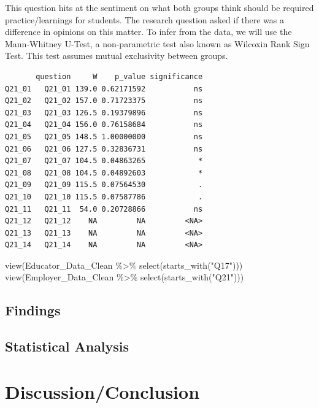 \documentclass[
  11pt,
  letterpaper,
  DIV=11,
  numbers=noendperiod]{scrartcl}
\newenvironment{Shaded}{\begin{snugshade}}{\end{snugshade}}
\newcommand{\FunctionTok}[1]{\textcolor[rgb]{0.28,0.35,0.67}{#1}}
\newcommand{\NormalTok}[1]{\textcolor[rgb]{0.00,0.23,0.31}{#1}}
\newcommand{\SpecialCharTok}[1]{\textcolor[rgb]{0.37,0.37,0.37}{#1}}
\newcommand{\StringTok}[1]{\textcolor[rgb]{0.13,0.47,0.30}{#1}}
\begin{document}
This question hits at the sentiment on what both groups think should be
required practice/learnings for students. The research question asked if
there was a difference in opinions on this matter. To infer from the
data, we will use the Mann-Whitney U-Test, a non-parametric test also
known as Wilcoxin Rank Sign Test. This test assumes mutual exclusivity
between groups.

\begin{verbatim}
       question     W    p_value significance
Q21_01   Q21_01 139.0 0.62171592           ns
Q21_02   Q21_02 157.0 0.71723375           ns
Q21_03   Q21_03 126.5 0.19379896           ns
Q21_04   Q21_04 156.0 0.76158684           ns
Q21_05   Q21_05 148.5 1.00000000           ns
Q21_06   Q21_06 127.5 0.32836731           ns
Q21_07   Q21_07 104.5 0.04863265            *
Q21_08   Q21_08 104.5 0.04892603            *
Q21_09   Q21_09 115.5 0.07564530            .
Q21_10   Q21_10 115.5 0.07587786            .
Q21_11   Q21_11  54.0 0.20728866           ns
Q21_12   Q21_12    NA         NA         <NA>
Q21_13   Q21_13    NA         NA         <NA>
Q21_14   Q21_14    NA         NA         <NA>
\end{verbatim}

\begin{Shaded}
\begin{Highlighting}[]
\FunctionTok{view}\NormalTok{(Educator\_Data\_Clean }\SpecialCharTok{\%\textgreater{}\%} \FunctionTok{select}\NormalTok{(}\FunctionTok{starts\_with}\NormalTok{(}\StringTok{"Q17"}\NormalTok{)))}
\FunctionTok{view}\NormalTok{(Employer\_Data\_Clean }\SpecialCharTok{\%\textgreater{}\%} \FunctionTok{select}\NormalTok{(}\FunctionTok{starts\_with}\NormalTok{(}\StringTok{"Q21"}\NormalTok{)))}
\end{Highlighting}
\end{Shaded}

\subsection{Findings}\label{findings}

\subsection{Statistical Analysis}\label{statistical-analysis}

\section{Discussion/Conclusion}\label{discussionconclusion}
\end{document}
